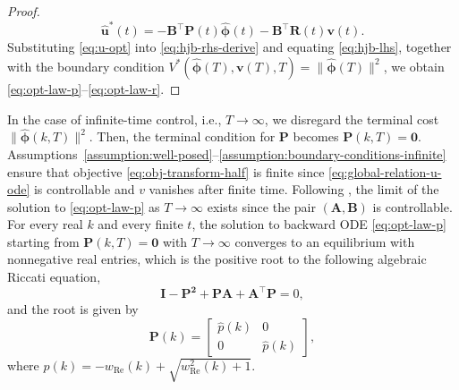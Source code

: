 \documentclass[journal,twoside,web]{ieeecolor}
\newcommand{\state}{\phi}
\newcommand{\statehat}{\hat{\state}}
\begin{document}
\begin{proof}
\begin{equation}\label{eq:u-opt}
	\boldsymbol{\hat{u}}^*(t) = -\mathbf{B}^\top \mathbf{P}(t)\boldsymbol{\statehat}(t) - \mathbf{B}^\top\mathbf{R}(t)\boldsymbol{v}(t).
\end{equation}
Substituting \eqref{eq:u-opt} into \eqref{eq:hjb-rhs-derive} and equating \eqref{eq:hjb-lhs}, 
together with the boundary condition $V^*(\boldsymbol{\statehat}(T),\boldsymbol{v}(T),T) = \|\boldsymbol{\statehat}(T)\|^2$, 
we obtain \eqref{eq:opt-law-p}--\eqref{eq:opt-law-r}.
\end{proof}


	In the case of infinite-time control, i.e., $T\to\infty$, we disregard the terminal cost $\|\boldsymbol{\statehat}(k,T)\|^2$. 
	Then, the terminal condition for $\mathbf{P}$ becomes $\mathbf{P}(k,T)=\mathbf{0}$.
	Assumptions~\ref{assumption:well-posed}--\ref{assumption:boundary-conditions-infinite} ensure that objective \eqref{eq:obj-transform-half} is finite since \eqref{eq:global-relation-u-ode} is controllable and $v$ vanishes after finite time.
	Following \cite[Section 6.2]{liberzon2011calculus}, the limit of the solution to \eqref{eq:opt-law-p} as $T\to\infty$ exists since the pair $(\mathbf{A},\mathbf{B})$ is controllable.
	 For every real $k$ and every finite $t$, the solution to backward ODE \eqref{eq:opt-law-p} starting from $\mathbf{P}(k,T)=\mathbf{0}$ with $T\to\infty$ converges to an equilibrium with nonnegative real entries, which is the positive root to the following algebraic Riccati equation,
	\begin{equation*}
		\mathbf{I - P^2 + PA + A^\top P}=0,
	\end{equation*}
	and the root is given by 
	\begin{equation*}
		\mathbf{P}(k) = \begin{bmatrix}
			\hat{p}(k)& 0 \\ 0 & \hat{p}(k)
		\end{bmatrix},
	\end{equation*}
	where $\hat{p}(k) = -w_{\text{Re}}(k) + \sqrt{w_{\text{Re}}^2(k) + 1}$.
\end{document}
